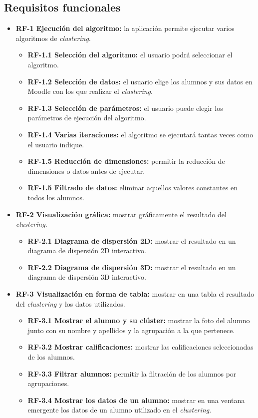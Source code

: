 \subsection{Requisitos funcionales}
\begin{itemize}

	\item \textbf{RF-1 Ejecución del algoritmo:} la aplicación permite ejecutar varios algoritmos de \emph{clustering}.
	\begin{itemize}
		\item \textbf{RF-1.1 Selección del algoritmo:} el usuario podrá seleccionar el algoritmo.
		\item \textbf{RF-1.2 Selección de datos:} el usuario elige los alumnos y sus datos en Moodle con los que realizar el \emph{clustering}.
		\item \textbf{RF-1.3 Selección de parámetros:} el usuario puede elegir los parámetros de ejecución del algoritmo.
		\item \textbf{RF-1.4 Varias iteraciones:} el algoritmo se ejecutará tantas veces como el usuario indique.
		\item \textbf{RF-1.5 Reducción de dimensiones:} permitir la reducción de dimensiones o datos antes de ejecutar.
		\item \textbf{RF-1.5 Filtrado de datos:} eliminar aquellos valores constantes en todos los alumnos.
	\end{itemize}

	\item \textbf{RF-2 Visualización gráfica:} mostrar gráficamente el resultado del \emph{clustering}.
	\begin{itemize}
		\item \textbf{RF-2.1 Diagrama de dispersión 2D:} mostrar el resultado en un diagrama de dispersión 2D interactivo.
		\item \textbf{RF-2.2 Diagrama de dispersión 3D:} mostrar el resultado en un diagrama de dispersión 3D interactivo.
	\end{itemize}

	\item \textbf{RF-3 Visualización en forma de tabla:} mostrar en una tabla el resultado del \emph{clustering} y los datos utilizados.
	\begin{itemize}
		\item \textbf{RF-3.1 Mostrar el alumno y su clúster:} mostrar la foto del alumno junto con su nombre y apellidos y la agrupación a la que pertenece.
		\item \textbf{RF-3.2 Mostrar calificaciones:} mostrar las calificaciones seleccionadas de los alumnos.
		\item \textbf{RF-3.3 Filtrar alumnos:} permitir la filtración de los alumnos por agrupaciones.
		\item \textbf{RF-3.4 Mostrar los datos de un alumno:} mostrar en una ventana emergente los datos de un alumno utilizado en el \emph{clustering}.
	\end{itemize}


\end{itemize}
